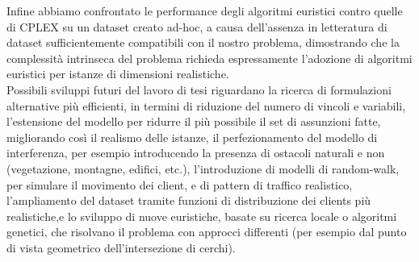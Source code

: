 Infine abbiamo confrontato le performance degli algoritmi euristici contro quelle di CPLEX su un dataset creato ad-hoc, a causa dell'assenza in letteratura di dataset sufficientemente compatibili con il nostro problema, dimostrando che la complessità intrinseca del problema richieda espressamente l'adozione di algoritmi euristici per istanze di dimensioni realistiche. \\
Possibili sviluppi futuri del lavoro di tesi riguardano la ricerca di formulazioni alternative più efficienti, in termini di riduzione del numero di vincoli e variabili, l'estensione del modello per ridurre il più possibile il set di assunzioni fatte, migliorando così il realismo delle istanze, il perfezionamento del modello di interferenza, per esempio introducendo la presenza di ostacoli naturali e non (vegetazione, montagne, edifici, etc.), l'introduzione di modelli di random-walk, per simulare il movimento dei client, e di pattern di traffico realistico, l'ampliamento del dataset tramite funzioni di distribuzione dei clients più realistiche,e lo sviluppo di nuove euristiche, basate su ricerca locale o algoritmi genetici, che risolvano il problema con approcci differenti (per esempio dal punto di vista geometrico dell'intersezione di cerchi).    
